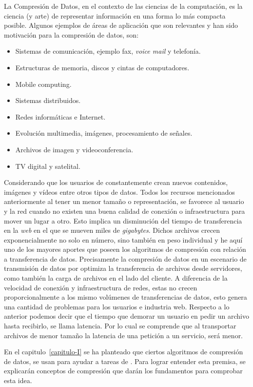 
 
La Compresión de Datos, en el contexto de las ciencias de la computación, es la ciencia (y arte) de representar información en una forma lo más compacta posible. Algunos ejemplos de áreas de aplicación que son relevantes y han sido motivación para la compresión de datos, son:

\begin{itemize}
	\menorEspacioItemize

	\item Sistemas de comunicación, ejemplo fax, \emph{voice mail} y telefonía.
	\item Estructuras de memoria, discos y cintas de computadores.
	\item Mobile computing.
	\item Sistemas distribuidos.
	\item Redes informáticas e Internet.
	\item Evolución multimedia, imágenes, procesamiento de señales.
	\item Archivos de imagen y videoconferencia.
	\item TV digital y satelital.

\end{itemize}


Considerando que los usuarios de \inet constantemente  crean nuevos contenidos, imágenes y vídeos  entre otros tipos de datos. Todos los recursos mencionados anteriormente al tener un menor tamaño o representación, se favorece al usuario y la red cuando no existen una buena calidad de conexión o infraestructura para mover un lugar a otro. Esto implica un disminución del tiempo de transferencia en la \emph{web} en el que se mueven miles de \emph{gigabytes}. Dichos archivos crecen exponencialmente no solo en número, sino también en peso individual y he aquí uno de los mayores aportes que poseen los algoritmos de compresión con relación a transferencia de datos. Precisamente la compresión de datos en un escenario de transmisión de datos por \inet optimiza la transferencia de archivos desde servidores, como también la carga de archivos en el lado del cliente. A diferencia de la velocidad de conexión y infraestructura de redes, estas no crecen proporcionalmente a los mismo volúmenes de transferencias de datos, esto genera una cantidad de problemas para los usuarios e industria web. Respecto a lo anterior podemos decir que el tiempo que demorar un usuario en pedir un archivo hasta recibirlo, se llama latencia. Por lo cual se comprende que al transportar archivos de menor tamaño la latencia de una petición a un servicio, será menor.


En el capitulo~\ref{capitulo-I} se ha planteado que ciertos algoritmos de compresión de datos, se usan para ayudar a tareas de \machinelearning. Para lograr entender esta premisa, se explicarán conceptos de compresión que darán los fundamentos para comprobar esta idea.


